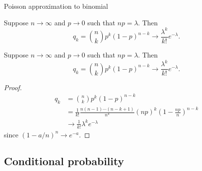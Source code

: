 %
\begin{note}
  \begin{field}
    Poisson approximation to binomial
  \end{field}
  \begin{field}
    \begin{thm}
      Suppose $n\to \infty$ and $p\to 0$ such that $np = \lambda$. Then
      \[
        q_k = \binom{n}{k}p^k(1 -p)^{n - k} \to \frac{\lambda^k}{k!}e^{-\lambda}.
      \]
    \end{thm}
  \end{field}
  \xplain{}%
\end{note}

%
\begin{note}
  \begin{field}
    \begin{thm}
      Suppose $n\to \infty$ and $p\to 0$ such that $np = \lambda$. Then
      \[
        q_k = \binom{n}{k}p^k(1 -p)^{n - k} \to \frac{\lambda^k}{k!}e^{-\lambda}.
      \]
    \end{thm}
  \end{field}
  \begin{field}
    \begin{proof}
    \begin{align*}
      q_k &= \binom{n}{k}p^k(1 - p)^{n - k}\\
      &= \frac{1}{k!} \frac{n(n - 1)\cdots(n - k + 1)}{n^k}(np)^k \left(1 - \frac{np}{n}\right)^{n - k}\\
      &\to \frac{1}{k!}\lambda^ke^{-\lambda}
    \end{align*}
    since $(1 - a/n)^n \to e^{-a}$.
    \end{proof}
  \end{field}
  \xplain{}%
\end{note}

\subsection{Conditional probability}

